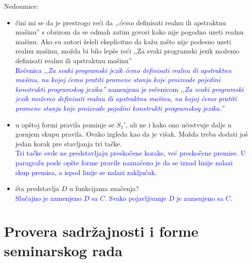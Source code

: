 \documentclass[a4paper]{report}
\newcommand{\odgovor}[1]{\textcolor{blue}{#1}}
\begin{document}
{Nedoumice:}
\begin{itemize}
	\item čini mi se da je prestrogo reći da ‚‚\textit{ćemo} definisati realnu ili apstraktnu mašinu'' s obzirom da se odmah zatim govori kako nije pogodno uzeti realnu mašinu. Ako su autori želeli eksplicitno da kažu zašto nije podesno uzeti realnu mašinu, možda bi bilo lepše reći ‚‚Za svaki programski jezik možemo definisati realnu ili apstraktnu mašinu''\\
\odgovor{Rečenica \textit{‚‚Za svaki programski jezik ćemo definisati realnu ili apstraktnu mašinu, na kojoj ćemo pratiti promene stanja koje proizvode pojedini konstrukti programskog jezika''} zamenjena je rečenicom \textit{‚‚Za svaki programski jezik možemo definisati realnu ili apstraktnu mašinu,
na kojoj ćemo pratiti promene stanja koje proizvode pojedini konstrukti
programskog jezika.''} }\\
	\item u opštoj formi pravila pominje se $S_1'$, ali ne i kako ono učestvuje dalje u gornjem skupu pravila. Ovako izgleda kao da je višak. Možda treba dodati još jedan korak pre stavljanja tri tačke.\\
\odgovor{Tri tačke ovde ne predstavljaju preskočene korake, već preskočene premise. U paragrafu posle opšte forme pravile naznačeno je da se iznad linije nalazi skup premisa, a ispod linije se nalazi zaključak.}\\
	\item šta predstavlja $D$ u funkcijama značenja?\\
	\odgovor{Slučajno je zamenjeno $D$ sa $C$. Svako pojavljivanje $D$ je zamenjeno sa $C$.}
\end{itemize}

\section{Provera sadržajnosti i forme seminarskog rada}
\end{document}
